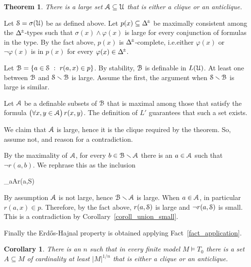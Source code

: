 \documentclass[10pt,oneside, openany]{book}
\def\A{\forall}
\def\models{\vDash}
\def\pmDelta{\Delta\hskip-.3ex\raisebox{1ex}{\tiny$\pm$}}
\def\sm{\smallsetminus}
\def\Aa{\EuScript A}
\def\U{\EuScript U}
\def\B{\EuScript B}
\def\S{\EuScript S}
\def\phi{\varphi}
\newcounter{thm}[chapter]
\theoremstyle{mio}
\newtheorem{theorem}[thm]{Theorem}
\newtheorem{corollary}[thm]{Corollary}
\theoremstyle{liscio}
\def\QED{\noindent\nolinebreak[4]\hfill\rlap{\ \ $\Box$}\medskip}
\renewenvironment{proof}[1][Proof]%
{\smallskip\begin{trivlist}\item[\hskip\labelsep {\bf #1}]}
{\QED\end{trivlist}}
\begin{document}
\begin{theorem}
  There is a large set $\Aa\subseteq\U$ that is either a clique or an anticlique.
\end{theorem}

\begin{proof}
  Let $\S=\sigma(\U)$ be as defined above.
  Let $p(x)\subseteq\pmDelta$ be maximally consistent among the $\pmDelta$-types such that $\sigma(x)\wedge\phi(x)$ is large for every conjunction of formulas in the type.
  By the fact above, $p(x)$ is $\pmDelta$-complete, i.e.\@ either $\phi(x)$ or $\neg\phi(x)$ is in $p(x)$ for every $\phi(x)\in\pmDelta$.


  Let $\B=\{a\in\S\ :\ r(a,x)\in p\}$.
  By stability, $\B$ is definable in $L(\U)$.
  At least one between $\B$ and $\S\sm\B$ is large.
  Assume the first, the argument when $\S\sm\B$ is large is similar.

  Let $\Aa$ be a definable subsets of $\B$ that is maximal among those that satisfy the formula $\big(\A x,y\in\Aa\big)\,r(x,y)$.
  The definition of $L'$ guarantees that such a set exists.
  
  We claim that $\Aa$ is large, hence it is the clique required by the theorem.
  So, assume not, and reason for a contradiction.

  By the maximality of $\Aa$, for every $b\in\B\sm\Aa$ there is an $a\in\Aa$ such that $\neg r(a,b)$.
  We rephrase this as the inclusion

  \ceq{\hfill\B\sm\Aa}
  {\subseteq}
  {\bigcup_{a\in\Aa}\neg r(a,\S)}

  By assumption $\Aa$ is not large, hence $\B\sm\Aa$ is large.
  When $a\in\Aa$, in particular $r(a,x)\in p$.
  Therefore, by the fact above, $r(a,\S)$ is large and $\neg r(a,\S)$ is small.
  This is a contradiction by Corollary~\ref{coroll_union_small}.
\end{proof}

Finally the Erd\H{o}s-Hajnal property is obtained applying Fact~\ref{fact_application}.

\begin{corollary}
  There is an $n$ such that in every finite model $M\models T_0$ there is a set $A\subseteq M$ of cardinality at least $|M|^{1/n}$ that is either a clique or an anticlique.\QED
\end{corollary}


\end{document}
